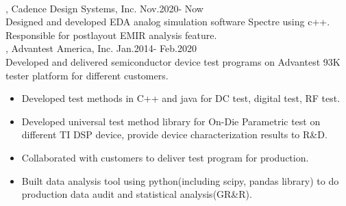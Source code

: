 \documentclass[11pt]{article} %
\begin{document}
\\
, Cadence Design Systems, Inc. Nov.2020- Now\\
\noindent Designed and developed EDA analog simulation software Spectre using c++. Responsible for postlayout EMIR analysis feature.\\
, Advantest America, Inc. Jan.2014- Feb.2020\\
\noindent Developed and delivered semiconductor device test programs on Advantest 93K tester platform for different customers.\\ 
\begin{itemize}  
    \item Developed test methods in C++ and java for DC test, digital test, RF test.\\
 \vspace{-4mm}
    \item  Developed universal test method library for On-Die Parametric test on different TI DSP device, provide device characterization results to R\&D.\\ 
 \vspace{-4mm}
  \item Collaborated with customers to deliver test program for production.\\
 \vspace{-4mm}
  \item Built data analysis tool using python(including scipy, pandas library) to do production data audit and statistical analysis(GR\&R).\\ 
 \end{itemize}
\end{document}
